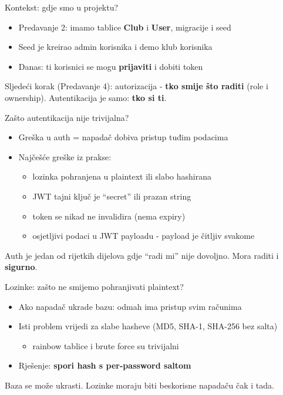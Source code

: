 \begin{frame}{Kontekst: gdje smo u projektu?}
	\begin{itemize}
		\item Predavanje 2: imamo tablice \textbf{Club} i \textbf{User}, migracije i seed
		\item Seed je kreirao admin korisnika i demo klub korisnika
		\item Danas: ti korisnici se mogu \textbf{prijaviti} i dobiti token
	\end{itemize}

	\vspace{0.6em}
	Sljedeći korak (Predavanje 4): autorizacija - \textbf{tko smije što raditi} (role i ownership).
	Autentikacija je samo: \textbf{tko si ti}.
\end{frame}

\begin{frame}{Zašto autentikacija nije trivijalna?}
	\begin{itemize}
		\item Greška u auth = napadač dobiva pristup tuđim podacima
		\item Najčešće greške iz prakse:
		\begin{itemize}
			\item lozinka pohranjena u plaintext ili slabo hashirana
			\item JWT tajni ključ je \enquote{secret} ili prazan string
			\item token se nikad ne invalidira (nema expiry)
			\item osjetljivi podaci u JWT payloadu - payload je čitljiv svakome
		\end{itemize}
	\end{itemize}

	\vspace{0.6em}
	Auth je jedan od rijetkih dijelova gdje \enquote{radi mi} nije dovoljno. Mora raditi i \textbf{sigurno}.
\end{frame}

\begin{frame}{Lozinke: zašto ne smijemo pohranjivati plaintext?}
	\begin{itemize}
		\item Ako napadač ukrade bazu: odmah ima pristup svim računima
		\item Isti problem vrijedi za slabe hasheve (MD5, SHA-1, SHA-256 bez salta)
		\begin{itemize}
			\item rainbow tablice i brute force su trivijalni
		\end{itemize}
		\item Rješenje: \textbf{spori hash s per-password saltom}
	\end{itemize}

	\vspace{0.6em}
	Baza se može ukrasti. Lozinke moraju biti beskorisne napadaču čak i tada.
\end{frame}

